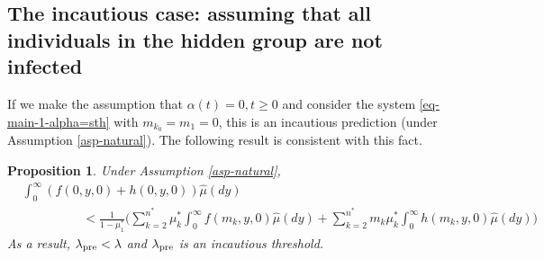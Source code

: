 \documentclass[12pt]{amsart}
\newtheorem{thm}{Theorem}[section]
\newtheorem{prop}{Proposition}[section]
\theoremstyle{remark}
\newtheorem{rem}{Remark}
\numberwithin{equation}{section}
\numberwithin{equation}{section}
\newcommand{\1}{\boldsymbol{1}}
\def\hat{\widehat}
\begin{document}
\subsection{The incautious case: assuming that all individuals in the hidden group are not infected}
If we make the assumption that $\alpha(t)=0, t\geq 0$ and consider the system \eqref{eq-main-1-alpha=sth} with $m_{k_0}=m_1=0$, this is an incautious prediction (under Assumption \ref{asp-natural}).
The following result is consistent with this fact.
%

\begin{prop}\label{thm-54}
	Under Assumption \ref{asp-natural},
	$$
	\begin{aligned}
	&\int_0^\infty (f(0,y,0)+h(0,y,0))\hat\mu(dy)\\
	&\hspace{2cm}<\frac 1{1-\mu_1^*}\Big(\sum_{k=2}^{n^*}\mu^*_k\int_0^\infty f(m_k,y,0)\hat\mu(dy)+\sum_{k=2}^{n^*} m_k\mu^*_k\int_0^\infty h(m_k,y,0)\hat\mu(dy)\Big)
	\end{aligned}
	$$
As a result, $\lambda_{{\rm\tiny pre}}<\lambda$ and $\lambda_{{\rm\tiny pre}}$ is an incautious threshold.
\end{prop}

\end{document}
